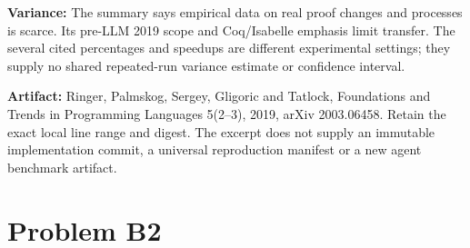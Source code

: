 \documentclass[11pt]{article}
\begin{document}
\begin{answer}
\textbf{Variance:} The summary says empirical data on real proof changes and processes is scarce. Its pre-LLM 2019 scope and Coq/Isabelle emphasis limit transfer. The several cited percentages and speedups are different experimental settings; they supply no shared repeated-run variance estimate or confidence interval.

\textbf{Artifact:} Ringer, Palmskog, Sergey, Gligoric and Tatlock, Foundations and Trends in Programming Languages 5(2--3), 2019, arXiv 2003.06458. Retain the exact local line range and digest. The excerpt does not supply an immutable implementation commit, a universal reproduction manifest or a new agent benchmark artifact.
\end{answer}
\section*{Problem B2}\label{ans:B2}
\end{document}
